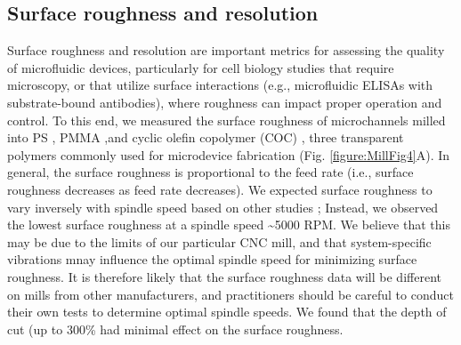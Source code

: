 \subsection{Surface roughness and resolution}
Surface roughness and resolution are important metrics for assessing the quality of microfluidic devices, particularly for cell biology studies that require microscopy, or that utilize surface interactions (e.g., microfluidic ELISAs with substrate-bound antibodies), where roughness can impact proper operation and control. To this end, we measured the surface roughness of microchannels milled into PS \cite{Young2011, Chen2008a}, PMMA \cite{Wabuyele2001, Klank2002},and cyclic olefin copolymer (COC) \cite{Steigert2007}, three transparent polymers commonly used for microdevice fabrication (Fig. \ref{figure:MillFig4}A). In general, the surface roughness is proportional to the feed rate (i.e., surface roughness decreases as feed rate decreases). We expected surface roughness to vary inversely with spindle speed based on other studies \cite{Kiswanto2014}; Instead, we observed the lowest surface roughness at a spindle speed \textasciitilde5000 RPM. We believe that this may be due to the limits of our particular CNC mill, and that system-specific vibrations \cite{Zhang2007} mnay influence the optimal spindle speed for minimizing surface roughness. It is therefore likely that the surface roughness data will be different on mills from other manufacturers, and practitioners should be careful to conduct their own tests to determine optimal spindle speeds. We found that the depth of cut (up to 300\% had minimal effect on the surface roughness.

